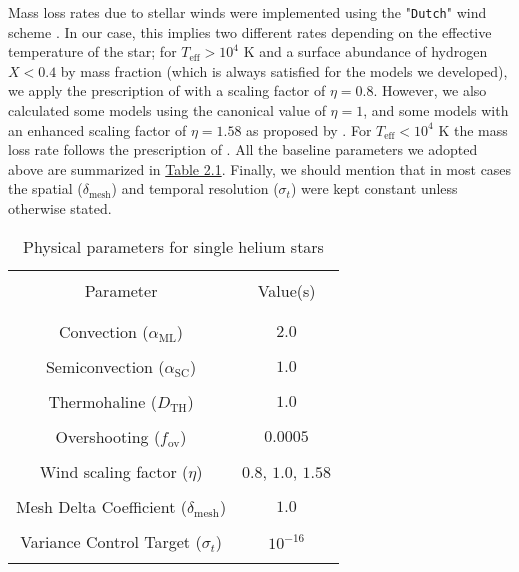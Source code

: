 \documentclass[../../main/thesis_msc.tex]{subfiles}
\begin{document}
    					Mass loss rates due to stellar winds were implemented using the "\texttt{Dutch}" wind scheme \citep{Dutch}. In our case, this implies two different rates depending on the effective temperature of the star; for $T_{\text{eff}} > 10^4$ K and a surface abundance of hydrogen $X < 0.4$ by mass fraction (which is always satisfied for the models we developed), we apply the prescription of \cite{Nugis2000} with a scaling factor of $\eta = 0.8$. However, we also calculated some models using the canonical value of $\eta = 1$, and some models with an enhanced scaling factor of $\eta = 1.58$ as proposed by \cite{yoon17}. For $T_{\text{eff}} < 10^4$ K the mass loss rate follows the prescription of \cite{deJager1988}. All the baseline parameters we adopted above are summarized in \hyperref[tab:parameters_single]{Table 2.1}. Finally, we should mention that in most cases the spatial ($\delta_{\text{mesh}}$) and temporal resolution ($\sigma_t$) were kept constant unless otherwise stated.
    					
    					\begin{table} [!h]
    						\begin{center}
    							\caption{Physical parameters for single helium stars}
    							\label{tab:parameters_single}
    						\end{center}
    						\centering
    						\begingroup
    							\setlength{\tabcolsep}{0.1\textwidth}
    							\begin{tabular}{cc}
    								\hline \hline \\
    							
    								Parameter & Value(s) \\\\
    								\hline \\
    								Convection ($\alpha_{\text{ML}}$) & $2.0$ \\\\
    							
    								Semiconvection ($\alpha_{\text{SC}}$) & $1.0$ \\\\
    							
    								Thermohaline ($D_{\text{TH}}$) & $1.0$ \\\\
    								
    								Overshooting ($f_{\text{ov}}$) & $0.0005$ \\\\
    							
    								Wind scaling factor ($\eta$) & $0.8$, $1.0$, $1.58$ \\\\
    								
    								Mesh Delta Coefficient ($\delta_{\text{mesh}}$) & $1.0$ \\\\
    								
    								Variance Control Target ($\sigma_t$) & $10^{-16}$ \\\\
    								\hline \hline
    							\end{tabular}
    						\endgroup
    					\end{table}
    					
\end{document}
